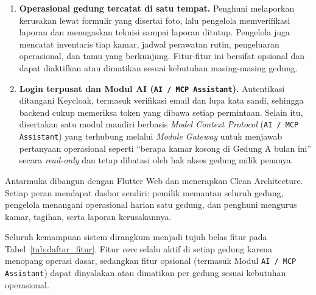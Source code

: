 \begin{enumerate}[label=\arabic*., leftmargin=*]
  \item \textbf{Operasional gedung tercatat di satu tempat.} Penghuni melaporkan kerusakan lewat formulir yang disertai foto, lalu pengelola memverifikasi laporan dan menugaskan teknisi sampai laporan ditutup. Pengelola juga mencatat inventaris tiap kamar, jadwal perawatan rutin, pengeluaran operasional, dan tamu yang berkunjung. Fitur-fitur ini bersifat opsional dan dapat diaktifkan atau dimatikan sesuai kebutuhan masing-masing gedung.
  \item \textbf{Login terpusat dan Modul AI (\texttt{AI / MCP Assistant}).} Autentikasi ditangani Keycloak, termasuk verifikasi email dan lupa kata sandi, sehingga backend cukup memeriksa token yang dibawa setiap permintaan. Selain itu, disertakan satu modul mandiri berbasis \textit{Model Context Protocol} (\texttt{AI / MCP Assistant}) yang terhubung melalui \textit{Module Gateway} untuk menjawab pertanyaan operasional seperti ``berapa kamar kosong di Gedung A bulan ini'' secara \textit{read-only} dan tetap dibatasi oleh hak akses gedung milik penanya.
\end{enumerate}

Antarmuka dibangun dengan Flutter Web dan menerapkan Clean Architecture. Setiap peran mendapat dasbor sendiri: pemilik memantau seluruh gedung, pengelola menangani operasional harian satu gedung, dan penghuni mengurus kamar, tagihan, serta laporan kerusakannya.

Seluruh kemampuan sistem dirangkum menjadi tujuh belas fitur pada Tabel~\ref{tab:daftar_fitur}. Fitur \textit{core} selalu aktif di setiap gedung karena menopang operasi dasar, sedangkan fitur opsional (termasuk Modul \texttt{AI / MCP Assistant}) dapat dinyalakan atau dimatikan per gedung sesuai kebutuhan operasional.

